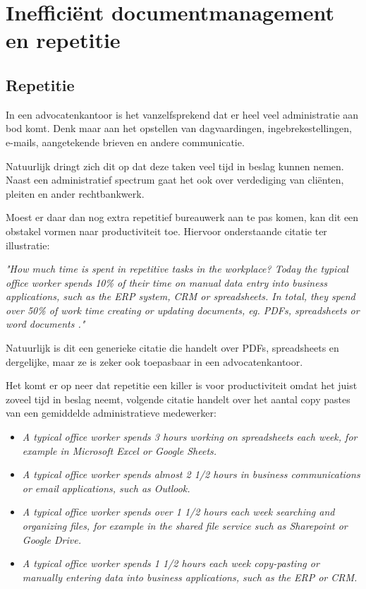 \section{Inefficiënt documentmanagement en repetitie}
\label{sec:documentmanagement}

\subsection{Repetitie}
In een advocatenkantoor is het vanzelfsprekend dat er heel veel administratie aan bod komt. Denk maar aan het opstellen van dagvaardingen,
ingebrekestellingen, e-mails, aangetekende brieven en andere communicatie.

Natuurlijk dringt zich dit op dat deze taken veel tijd in beslag kunnen nemen. Naast een administratief spectrum gaat het ook over verdediging van cliënten, pleiten en ander rechtbankwerk.

Moest er daar dan nog extra repetitief bureauwerk aan te pas komen, kan dit een obstakel vormen naar productiviteit toe. Hiervoor onderstaande citatie ter illustratie:
\begin{displayquote}
	\textit{"How much time is spent in repetitive tasks in the workplace? Today the typical office worker spends 10\% of their time on manual data entry into business applications,
		such as the ERP system, CRM or spreadsheets. In total, they spend over 50\% of work time creating or updating documents, eg. PDFs, spreadsheets or word documents \autocite{Workfellow}."}
\end{displayquote}

Natuurlijk is dit een generieke citatie die handelt over PDFs, spreadsheets en dergelijke, maar ze is zeker ook toepasbaar in een advocatenkantoor.

Het komt er op neer dat repetitie een killer is voor productiviteit omdat het juist zoveel tijd in beslag neemt,
volgende citatie handelt over het aantal copy pastes van een gemiddelde administratieve medewerker:

\begin{displayquote}
	\begin{itemize}
		\item \emph {A typical office worker spends 3 hours working on spreadsheets each week, for example in Microsoft Excel or Google Sheets.}
		\item \emph {A typical office worker spends almost 2 1/2 hours in business communications or email applications, such as Outlook.}
		\item \emph {A typical office worker spends over 1 1/2 hours each week searching and organizing files, for example in the shared file service such as Sharepoint or Google Drive.}
		\item \emph {A typical office worker spends 1 1/2 hours each week copy-pasting or manually entering data into business applications, such as the ERP or CRM.} \autocite{Workfellow}
	\end{itemize}
\end{displayquote}

